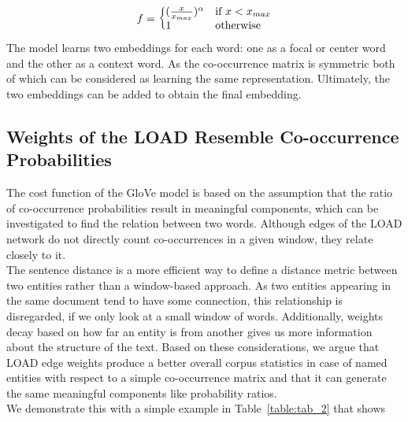 \begin{equation}
f=\left\{
  \begin{array}{@{}ll@{}}
    (\frac { x }{ { x }_{ max } } )^{ \alpha  }& \text{if}\ x<x_{max} \\
    1 & \text{otherwise}
  \end{array}\right.
\label{eq:weighingfunction}
\end{equation}
\noindent
The model learns two embeddings for each word: one as a focal or center word and the other as a context word. As the co-occurrence matrix is symmetric both of which can be considered as learning the same representation. Ultimately, the two embeddings can be added to obtain the final embedding.

\subsection{Weights of the LOAD Resemble Co-occurrence Probabilities}
The cost function of the GloVe model is based on the assumption that the ratio of co-occurrence probabilities result in meaningful components, which can be investigated to find the relation between two words. Although edges of the LOAD network do not directly count co-occurrences in a given window, they relate closely to it. \\
The sentence distance is a more efficient way to define a distance metric between two entities rather than a window-based approach. As two entities appearing in the same document tend to have some connection, this relationship is disregarded, if we only look at a small window of words. Additionally, weights decay based on how far an entity is from another gives us more information about the structure of the text. Based on these considerations, we argue that LOAD edge weights produce a better overall corpus statistics in case of named entities with respect to a simple co-occurrence matrix and that it can generate the same meaningful components like probability ratios. \\
We demonstrate this with a simple example in Table~\ref{table:tab_2} that shows
